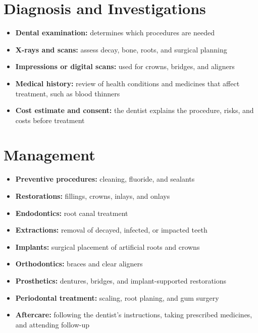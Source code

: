 \section*{Diagnosis and Investigations}
\begin{itemize}
    \item \textbf{Dental examination:} determines which procedures are needed
    \item \textbf{X-rays and scans:} assess decay, bone, roots, and surgical planning
    \item \textbf{Impressions or digital scans:} used for crowns, bridges, and aligners
    \item \textbf{Medical history:} review of health conditions and medicines that affect treatment, such as blood thinners
    \item \textbf{Cost estimate and consent:} the dentist explains the procedure, risks, and costs before treatment
\end{itemize}

\section*{Management}
\begin{itemize}
    \item \textbf{Preventive procedures:} cleaning, fluoride, and sealants
    \item \textbf{Restorations:} fillings, crowns, inlays, and onlays
    \item \textbf{Endodontics:} root canal treatment
    \item \textbf{Extractions:} removal of decayed, infected, or impacted teeth
    \item \textbf{Implants:} surgical placement of artificial roots and crowns
    \item \textbf{Orthodontics:} braces and clear aligners
    \item \textbf{Prosthetics:} dentures, bridges, and implant-supported restorations
    \item \textbf{Periodontal treatment:} scaling, root planing, and gum surgery
    \item \textbf{Aftercare:} following the dentist's instructions, taking prescribed medicines, and attending follow-up
\end{itemize}

